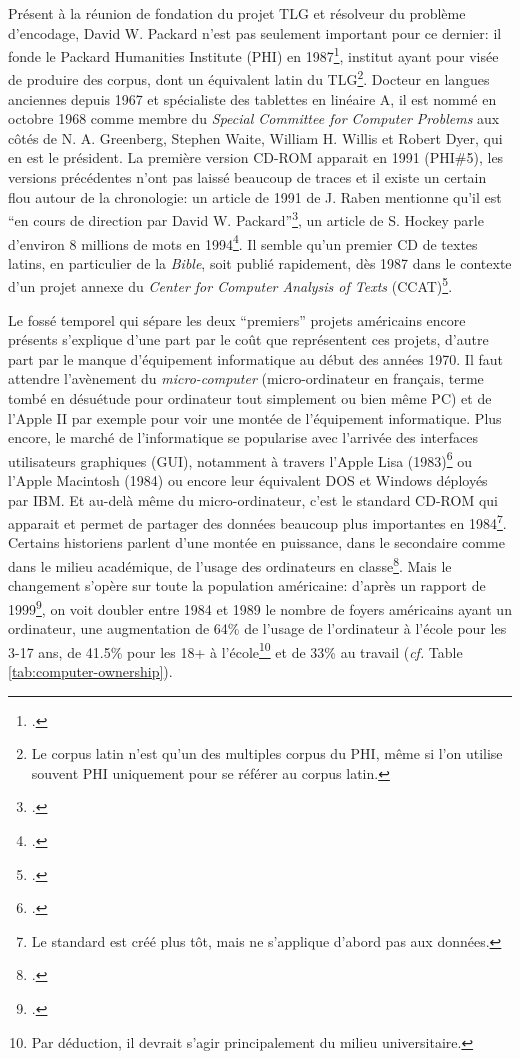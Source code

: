 Présent à la réunion de fondation du projet TLG et résolveur du problème d'encodage, David W. Packard n'est pas seulement important pour ce dernier: il fonde le Packard Humanities Institute (PHI) en 1987\footcite{helgerson_cd-rom_1988}, institut ayant pour visée de produire des corpus, dont un équivalent latin du TLG\footnote{Le corpus latin n'est qu'un des multiples corpus du PHI, même si l'on utilise souvent PHI uniquement pour se référer au corpus latin.}. Docteur en langues anciennes depuis 1967 et spécialiste des tablettes en linéaire A, il est nommé en octobre 1968 comme membre du \textit{Special Committee for Computer Problems} aux côtés de N. A. Greenberg, Stephen Waite, William H. Willis et Robert Dyer, qui en est le président. La première version CD-ROM apparait en 1991 (PHI\#5), les versions précédentes n'ont pas laissé beaucoup de traces et il existe un certain flou autour de la chronologie: un article de 1991 de J. Raben mentionne qu'il est \enquote{en cours de direction par David W. Packard}\footcite{raben_humanities_1991}, un article de S. Hockey parle d'environ 8 millions de mots en 1994\footcite{hockey_electronic_1994}. Il semble qu'un premier CD de textes latins, en particulier de la \textit{Bible}, soit publié rapidement, dès 1987 dans le contexte d'un projet annexe du \textit{Center for Computer Analysis of Texts} (CCAT)\footcite{groves_tovs_1990, cornell_greek_1989}.

Le fossé temporel qui sépare les deux \enquote{premiers} projets américains encore présents s'explique d'une part par le coût que représentent ces projets, d'autre part par le manque d'équipement informatique au début des années 1970. Il faut attendre l'avènement du \textit{micro-computer} (micro-ordinateur en français, terme tombé en désuétude pour ordinateur tout simplement ou bien même PC) et de l'Apple II par exemple pour voir une montée de l'équipement informatique. Plus encore, le marché de l'informatique se popularise avec l'arrivée des interfaces utilisateurs graphiques (GUI), notamment à travers l'Apple Lisa (1983)\footcite{noauthor_history_2021} ou l'Apple Macintosh (1984) ou encore leur équivalent DOS et Windows déployés par IBM. Et au-delà même du micro-ordinateur, c'est le standard CD-ROM qui apparait et permet de partager des données beaucoup plus importantes en 1984\footnote{Le standard est créé plus tôt, mais ne s'applique d'abord pas aux données.}. Certains historiens parlent d'une montée en puissance, dans le secondaire comme dans le milieu académique, de l'usage des ordinateurs en classe\footcite{simkin_introduction_1989, latousek_fifty_2001}. Mais le changement s'opère sur toute la population américaine: d'après un rapport de 1999\footcite{kominski1999access}, on voit doubler  entre 1984 et 1989 le nombre de foyers américains ayant un ordinateur, une augmentation de 64\% de l'usage de l'ordinateur à l'école pour les 3-17 ans, de 41.5\% pour les 18+ à l'école\footnote{Par déduction, il devrait s'agir principalement du milieu universitaire.} et de 33\% au travail (\textit{cf.} Table \ref{tab:computer-ownership}).

